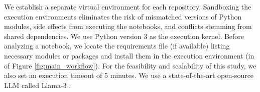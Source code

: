  We establish a separate virtual environment for each repository. Sandboxing the execution environments eliminates the risk of mismatched versions of Python modules, side effects from executing the notebooks, and conflicts stemming from shared dependencies. We use Python version 3 as the execution kernel. Before analyzing a notebook, we locate the requirements file (if available) listing necessary modules or packages and install them in the execution environment (in  of Figure \ref{fig:main_workflow}). 
For the feasibility and scalability of this study, we also set an execution timeout of 5 minutes.
We use a state-of-the-art open-source LLM called Llama-3 \cite{llama3, touvron2023llama}.%
    
    

    
  
